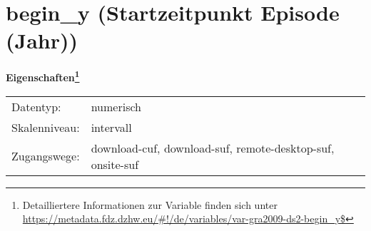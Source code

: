 
    \setcounter{footnote}{0}

    \vspace*{-1.8cm}
	\section{begin\_y (Startzeitpunkt Episode (Jahr))}
	\label{section:begin_y}



    \vspace*{0.5cm}
    \noindent\textbf{Eigenschaften\footnote{Detailliertere Informationen zur Variable finden sich unter
		\url{https://metadata.fdz.dzhw.eu/\#!/de/variables/var-gra2009-ds2-begin_y$}}}\\
	\begin{tabularx}{\hsize}{@{}lX}
	Datentyp: & numerisch \\
	Skalenniveau: & intervall \\
	Zugangswege: &
	  download-cuf, 
	  download-suf, 
	  remote-desktop-suf, 
	  onsite-suf
 \\
    \end{tabularx}



